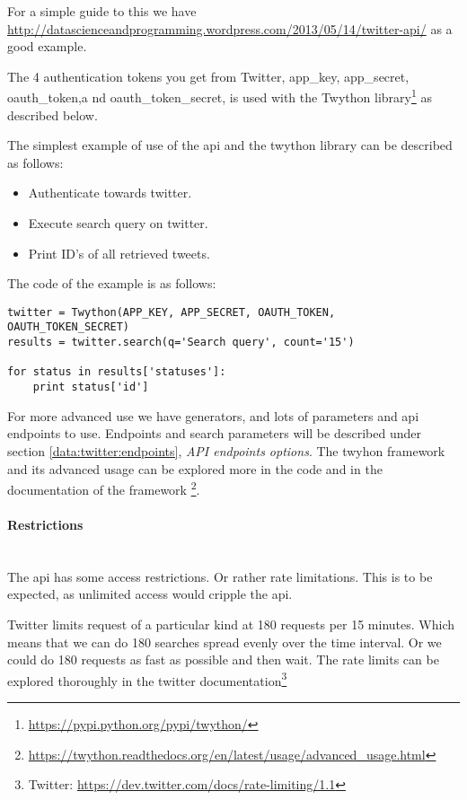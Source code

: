 For a simple guide to this we have
\url{http://datascienceandprogramming.wordpress.com/2013/05/14/twitter-api/} as
a good example.

The 4 authentication tokens you get from Twitter, app\_key, app\_secret, oauth\_token,a nd
oauth\_token\_secret, is used with the Twython
library\footnote{\url{https://pypi.python.org/pypi/twython/}} as described
below.

The simplest example of use of the api and the twython library can be described
as follows:
\begin{itemize}
	\item Authenticate towards twitter.
	\item Execute search query on twitter.
	\item Print ID's of all retrieved tweets.
\end{itemize} 

The code of the example is as follows:
\begin{listing}
\begin{verbatim}
twitter = Twython(APP_KEY, APP_SECRET, OAUTH_TOKEN, OAUTH_TOKEN_SECRET)
results = twitter.search(q='Search query', count='15')

for status in results['statuses']:
    print status['id']
\end{verbatim}
\end{listing}

For more advanced use we have generators, and lots of parameters and api
endpoints to use. Endpoints and search parameters will be described under
section \ref{data:twitter:endpoints}, \textit{API endpoints options}. 
The twyhon framework and its advanced usage can be explored more in the code and
in the documentation of the framework
\footnote{\url{https://twython.readthedocs.org/en/latest/usage/advanced_usage.html}}.
%

\paragraph{Restrictions}
\hspace{0pt}\\
The api has some access restrictions. Or rather rate limitations. This is to be
expected, as unlimited access would cripple the api.

Twitter limits request of a particular kind at 180 requests per 15 minutes.
Which means that we can do 180 searches spread evenly over the time interval. Or
we could do 180 requests as fast as possible and then wait. The rate limits can
be explored thoroughly in the twitter documentation\footnote{Twitter:
\url{https://dev.twitter.com/docs/rate-limiting/1.1}}

